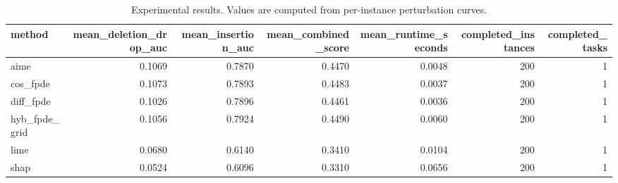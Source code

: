 \begin{table}[t]
\caption{Experimental results. Values are computed from per-instance perturbation curves.}
\label{tab:main_results_computed}
\centering
\begin{tabular}{lrrrrrr}
\toprule
method & mean\_deletion\_drop\_auc & mean\_insertion\_auc & mean\_combined\_score & mean\_runtime\_seconds & completed\_instances & completed\_tasks \\
\midrule
aime & 0.1069 & 0.7870 & 0.4470 & 0.0048 & 200 & 1 \\
cos\_fpde & 0.1073 & 0.7893 & 0.4483 & 0.0037 & 200 & 1 \\
diff\_fpde & 0.1026 & 0.7896 & 0.4461 & 0.0036 & 200 & 1 \\
hyb\_fpde\_grid & 0.1056 & 0.7924 & 0.4490 & 0.0060 & 200 & 1 \\
lime & 0.0680 & 0.6140 & 0.3410 & 0.0104 & 200 & 1 \\
shap & 0.0524 & 0.6096 & 0.3310 & 0.0656 & 200 & 1 \\
\bottomrule
\end{tabular}

\end{table}
